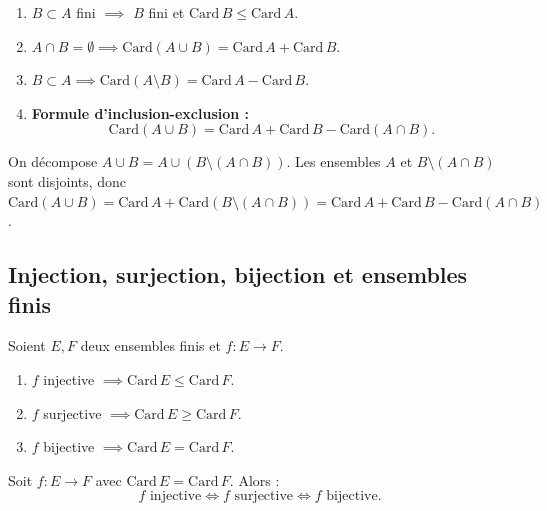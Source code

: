 \begin{propbox}
\begin{enumerate}[leftmargin=1.5cm]
  \item $B \subset A$ fini $\implies$ $B$ fini et $\mathrm{Card}\, B \leqslant \mathrm{Card}\, A$.
  \item $A \cap B = \emptyset \implies \mathrm{Card}(A \cup B) = \mathrm{Card}\, A + \mathrm{Card}\, B$.
  \item $B \subset A \implies \mathrm{Card}(A \setminus B) = \mathrm{Card}\, A - \mathrm{Card}\, B$.
  \item \textbf{Formule d'inclusion-exclusion :}
    \[\mathrm{Card}(A \cup B) = \mathrm{Card}\, A + \mathrm{Card}\, B - \mathrm{Card}(A \cap B).\]
\end{enumerate}
\end{propbox}

\begin{proofbox}
On décompose $A \cup B = A \cup (B \setminus (A \cap B))$. Les ensembles $A$ et $B \setminus (A \cap B)$ sont disjoints, donc $\mathrm{Card}(A \cup B) = \mathrm{Card}\, A + \mathrm{Card}(B \setminus (A \cap B)) = \mathrm{Card}\, A + \mathrm{Card}\, B - \mathrm{Card}(A \cap B)$.
\end{proofbox}


\subsection{Injection, surjection, bijection et ensembles finis}

\begin{propbox}
Soient $E, F$ deux ensembles finis et $f : E \to F$.
\begin{enumerate}[leftmargin=1.5cm]
  \item $f$ injective $\implies \mathrm{Card}\, E \leqslant \mathrm{Card}\, F$.
  \item $f$ surjective $\implies \mathrm{Card}\, E \geqslant \mathrm{Card}\, F$.
  \item $f$ bijective $\implies \mathrm{Card}\, E = \mathrm{Card}\, F$.
\end{enumerate}
\end{propbox}

\begin{propbox}
Soit $f : E \to F$ avec $\mathrm{Card}\, E = \mathrm{Card}\, F$. Alors :
\[f \text{ injective} \iff f \text{ surjective} \iff f \text{ bijective}.\]
\end{propbox}

